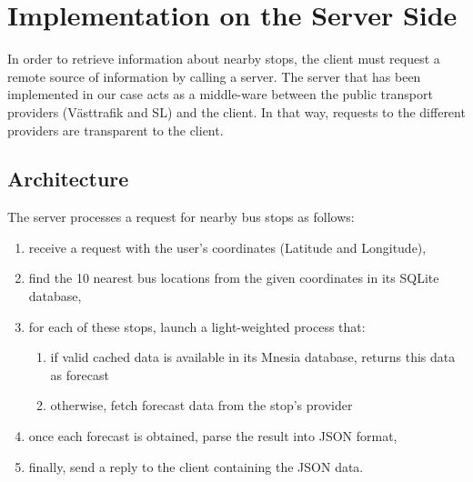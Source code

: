 \chapter{Implementation on the Server Side}
\label{cha:on_the_server_side}

In order to retrieve information about nearby stops, the client must request a remote source of information by calling a server. The server that has been implemented in our case acts as a middle-ware between the public transport providers (Västtrafik and SL) and the client. In that way, requests to the different providers are transparent to the client.

\section{Architecture}

The server processes a request for nearby bus stops as follows:

\begin{enumerate}
\item{receive a request with the user's coordinates (Latitude and Longitude),}
\item{find the 10 nearest bus locations from the given coordinates in its SQLite database,}
\item{for each of these stops, launch a light-weighted process that:
\begin{enumerate}
	\item{if valid cached data is available in its Mnesia database, returns this data as forecast}
	\item{otherwise, fetch forecast data from the stop's provider}
\end{enumerate}
}
\item{once each forecast is obtained, parse the result into JSON format,}
\item{finally, send a reply to the client containing the JSON data.}
\end{enumerate}

